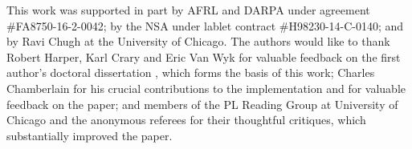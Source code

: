 \documentclass[acmsmall,screen]{acmart}
\begin{document}
\begin{acks}                            %
   This work was
supported in part by AFRL and DARPA under agreement \#FA8750-16-2-0042;
 by the NSA under lablet contract \#H98230-14-C-0140; and by Ravi Chugh
 at the University of Chicago. The authors
would like to thank Robert Harper, Karl Crary and Eric Van Wyk for 
valuable feedback on the first author's doctoral dissertation \cite{omar-thesis}, which forms the basis of this work; 
Charles Chamberlain 
for his crucial contributions to the implementation and for valuable feedback on the
paper; and members of the PL Reading Group at University of Chicago and the anonymous referees
 for their thoughtful critiques, which substantially improved the paper.

\end{acks}

\clearpage

\end{document}

